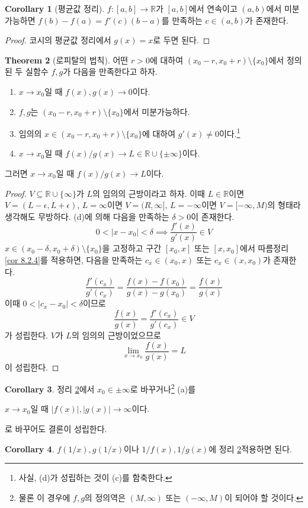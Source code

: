 \documentclass[11pt]{book}
\numberwithin{equation}{chapter}
\def\RR{\mathbb{R}}
\def\eps{\epsilon}
\newcommand{\abs}[1]{\left\vert#1\right\vert}
\theoremstyle{definition}
\newtheorem{thm}{Theorem}[section]
\newtheorem{cor}[thm]{Corollary}
\newenvironment{enum}
	{\begin{enumerate}[label=(\alph*), leftmargin=2\parindent]}
	{\end{enumerate}}
\begin{document}
\begin{cor}[평균값 정리]
    \(f : [a, b] \to \RR\)가 \([a, b]\)에서 연속이고 \((a, b)\)에서 미분가능하면 \(f(b) - f(a) = f'(c)(b - a)\)를 만족하는 \(c \in (a, b)\)가 존재한다.
\end{cor}
\begin{proof}
    코시의 평균값 정리에서 \(g(x) = x\)로 두면 된다.
\end{proof}

\begin{thm}[로피탈의 법칙] \label{thm 8.2.5}
    어떤 \(r > 0\)에 대하여 \((x_0 - r, x_0 + r) \setminus \{x_0\}\)에서 정의된 두 실함수 \(f, g\)가 다음을 만족한다고 하자.
    \begin{enum}
        \item \(x \to x_0\)일 때 \(f(x), g(x) \to 0\)이다.
        \item \(f, g\)는 \((x_0 - r, x_0 + r) \setminus \{x_0\}\)에서 미분가능하다.
        \item 임의의 \(x \in (x_0 - r, x_0 + r) \setminus \{x_0\}\)에 대하여 \(g'(x) \ne 0\)이다.\footnote{사실, (d)가 성립하는 것이 (c)를 함축한다.}
        \item \(x \to x_0\)일 때 \(f(x) / g(x) \to L \in \RR \cup \{\pm \infty\}\)이다.
    \end{enum}
    그러면 \(x \to x_0\)일 때 \(f(x)/g(x) \to L\)이다.
\end{thm}
\begin{proof}
    \(V \subseteq \RR \cup \{\infty\}\)가 \(L\)의 임의의 근방이라고 하자. 이때 \(L \in \RR\)이면 \(V = (L - \eps, L + \eps)\), \(L = \infty\)이면 \(V = (R, \infty]\), \(L = -\infty\)이면 \(V = [-\infty, M)\)의 형태라 생각해도 무방하다. (d)에 의해 다음을 만족하는 \(\delta > 0\)이 존재한다.
    \[
    0 < \abs{x - x_0} < \delta \implies \frac{f'(x)}{g'(x)} \in V
    \]
    \(x \in (x_0 - \delta, x_0 + \delta) \setminus \{x_0\}\)을 고정하고 구간 \([x_0, x]\) 또는 \([x, x_0]\)에서 따름정리 \ref{cor 8.2.4}를 적용하면, 다음을 만족하는 \(c_x \in (x_0, x)\) 또는 \(c_x \in (x, x_0)\)가 존재한다.
    \[
        \frac{f'(c_x)}{g'(c_x)} = \frac{f(x) - f(x_0)}{g(x) - g(x_0)} = \frac{f(x)}{g(x)}
    \]
    이때 \(0 < \abs{c_x - x_0} < \delta\)이므로
    \[
        \frac{f(x)}{g(x)} = \frac{f'(c_x)}{g'(c_x)} \in V
    \]
    가 성립한다. \(V\)가 \(L\)의 임의의 근방이었으므로
    \[
      \lim_{x \to x_0} \frac{f(x)}{g(x)} = L  
    \]
    이 성립한다.
\end{proof}

\begin{cor}
    정리 \ref{thm 8.2.5}에서 \(x_0 \in \pm \infty\)로 바꾸거나\footnote{물론 이 경우에 \(f, g\)의 정의역은 \((M, \infty)\) 또는 \((-\infty, M)\)이 되어야 할 것이다.} (a)를
    \begin{center}
        \(x \to x_0\)일 때 \(\abs{f(x)}, \abs{g(x)} \to \infty\)이다.
    \end{center}
    로 바꾸어도 결론이 성립한다.
\end{cor}
\begin{cor}
    \(f(1/x), g(1/x)\)이나 \(1/f(x), 1/g(x)\)에 정리 \ref{thm 8.2.5}\를 적용하면 된다.
\end{cor}
\end{document}
